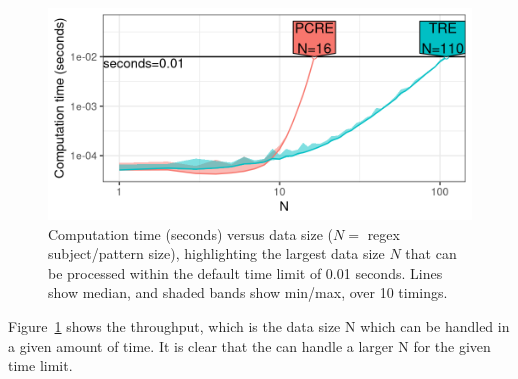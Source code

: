 \begin{figure}[t]
    \centering
    \includegraphics[width=0.9\linewidth]{create_subject_pattern_pred.png}
    \caption{Computation time (seconds) versus data size ($N =$ regex subject/pattern size), highlighting the largest data size $N$ that can be processed within the default time limit of 0.01 seconds. 
    Lines show median, and shaded bands show min/max, over 10 timings.}
    \label{fig:plot-pred-list-PCRE-TRE}
\end{figure}
Figure~\ref{fig:plot-pred-list-PCRE-TRE} shows the throughput, which is the data size N which can be handled in a given amount of time. 
It is clear that the  can handle a larger N for the given time limit.


